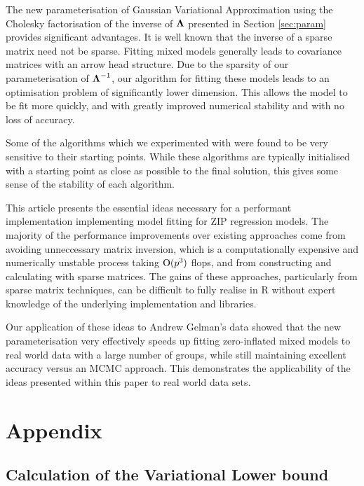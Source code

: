 \documentclass{amsart}[12pt]
\begin{document}
			The new parameterisation of Gaussian Variational Approximation using the Cholesky factorisation of the inverse of ${\boldsymbol \Lambda}$ presented in Section \ref{sec:param} provides significant advantages.  It is well known that the inverse of a sparse matrix need not be sparse. Fitting mixed models generally leads to covariance matrices with an arrow head structure. Due to the sparsity of our parameterisation of ${\boldsymbol \Lambda}^{-1}$,  our algorithm for fitting these models leads to an optimisation problem of significantly lower dimension. This allows the model to be fit more quickly, and with greatly improved numerical stability and with no loss of
			accuracy.
				
			Some of the algorithms which we experimented with were found to be very sensitive to their starting points.
			While these algorithms are typically initialised with a starting point as close as possible to the final
			solution, this gives some sense of the stability of each algorithm.
					
			This article presents the essential ideas necessary for a performant implementation implementing model fitting
			for ZIP regression models.%
			The majority of the performance
			improvements over existing approaches come from avoiding unneccessary matrix inversion, which is a
			computationally expensive and numerically unstable process taking $\text{O}(p^3)$ flops, and from constructing and 
			calculating	with sparse matrices. The gains of these approaches, particularly from sparse matrix techniques, 
			can be difficult to fully realise in R without expert knowledge of the underlying implementation and libraries.
					
			Our application of these ideas to Andrew Gelman's data showed that the new parameterisation very effectively
			speeds up fitting zero-inflated mixed models to real world data with a large number of groups, while still
			maintaining excellent accuracy versus an MCMC approach. This demonstrates the applicability of the ideas
			presented within this paper to real world data sets.
					
			\newpage
			\section{Appendix} 
			\subsection{Calculation of the Variational Lower bound}
					
\end{document}
